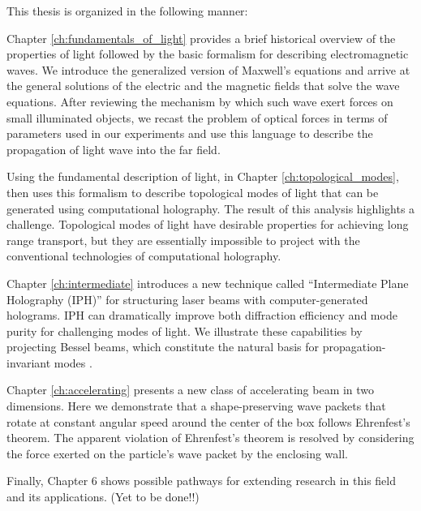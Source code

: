 This thesis is organized in the following manner:

Chapter \ref{ch:fundamentals_of_light} provides a brief historical overview of the properties of light followed by the basic formalism for describing electromagnetic waves. We introduce the generalized version of Maxwell's equations and arrive at the general solutions of the electric and the magnetic fields that solve the wave equations. After reviewing the mechanism by which such wave exert forces on small illuminated objects, we recast the problem of optical forces in terms of parameters used in our experiments and use this language to describe the propagation of light wave into the far field. 

Using the fundamental description of light, in Chapter \ref{ch:topological_modes}, then uses this formalism to  describe topological modes of light that can be generated using computational holography. The result of this analysis highlights a challenge. Topological modes of light have desirable properties for achieving long range transport, but they are essentially impossible to project with the conventional technologies of computational holography.

Chapter \ref{ch:intermediate} introduces a new technique called ``Intermediate Plane Holography (IPH)''  for structuring laser beams with computer-generated holograms. IPH can dramatically improve both diffraction efficiency and mode purity for challenging modes of light. We illustrate these capabilities by projecting Bessel beams, which constitute the natural basis for propagation-invariant modes \cite{durnin87,durnin87a}.

Chapter \ref{ch:accelerating} presents a new class of accelerating beam in two dimensions. Here we demonstrate that a shape-preserving wave packets that rotate at constant angular speed around the center of the box follows Ehrenfest's theorem. The apparent violation of Ehrenfest’s theorem is resolved by considering the force exerted on the particle’s wave packet by the enclosing wall.

Finally, Chapter 6 shows possible pathways for extending research in this field and its applications. (Yet to be done!!)

